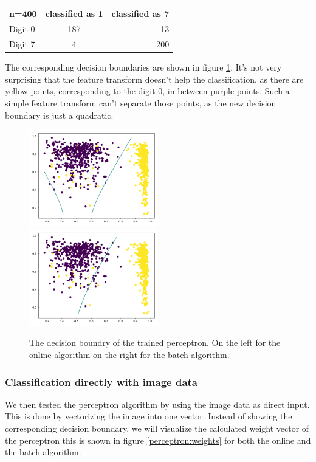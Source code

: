 \begin{tabular}{ l | c | r }
\centering
  n=400 & classified as 1 & classified as 7 \\ \hline
  Digit 0 & 187 & 13 \\
  Digit 7 & 4 & 200 \\
\end{tabular}

The corresponding decision boundaries are shown in figure \ref{perceptron:decision:5d}. It's not very surprising that the feature transform doesn't help the classification. as there are yellow points, corresponding to the digit 0, in between purple points. Such a simple feature transform can't separate those points, as the new decision boundary is just a quadratic.

\begin{figure}
\includegraphics[width = 0.5\textwidth]{figures/decision_5d_online}
\includegraphics[width = 0.5\textwidth]{figures/decision_5d_batch}
\caption{The decision boundry of the trained perceptron. On the left for the online algorithm on the right for the batch algorithm.}
\label{perceptron:decision:5d}
\end{figure}

\subsubsection{Classification directly with image data}
We then tested the perceptron algorithm by using the image data as direct input. This is done by vectorizing the image into one vector. Instead of showing the corresponding decision boundary, we will visualize the calculated weight vector of the perceptron this is shown in figure \ref{perceptron:weights} for both the online and the batch algorithm.


